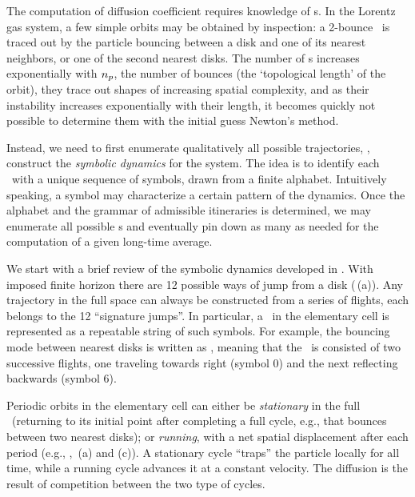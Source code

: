 


The computation of diffusion coefficient  requires
knowledge of \po s. In the Lorentz gas system, a few simple orbits may be
obtained by inspection: a 2-bounce \po\ is traced out by the particle
bouncing between a disk and one of its nearest neighbors, or one of the
second nearest disks. The number of \po s increases exponentially with
${n_{p}}$, the number of bounces (the `topological length' of the
orbit), they trace out shapes of increasing spatial complexity, and as
their instability increases exponentially with their length, it
becomes quickly not possible to determine them with the initial guess
Newton's method.

Instead, we need to first enumerate qualitatively all possible
trajectories, \ie, construct the \emph{symbolic dynamics} for the system.
The idea is to identify each \po\ with a unique sequence of symbols,
drawn from a finite alphabet. Intuitively speaking, a symbol may
characterize a certain pattern of the dynamics. Once the alphabet and the
grammar of admissible itineraries is determined, we may enumerate all
possible \po s and eventually pin down as many as needed for the
computation of a given long-time average.

We start with a brief review of the symbolic dynamics developed in
. With imposed finite horizon there are 12 possible ways of
jump from a disk (\,(a)). Any trajectory
in the full space can always be constructed from a series of flights,
each belongs to the 12 ``signature jumps''. In particular, a \po\ in the
elementary cell is represented as a repeatable string of such symbols.
For example, the bouncing mode between nearest disks is written as
, meaning that the \po\ is consisted of two successive flights,
one traveling towards right (symbol $0$) and the
next reflecting backwards (symbol $6$).

Periodic orbits in the elementary cell can either be \emph{stationary} in
the full \statesp\ (returning to its initial point after completing a
full cycle, e.g.,  that bounces between two nearest disks); or
\emph{running}, with a net spatial displacement after each period (e.g.,
, \,(a) and (c)). A stationary
cycle ``traps'' the  particle locally for all time, while a running cycle
advances it at a constant  velocity. The diffusion  is
the result of competition between the two type of cycles.

